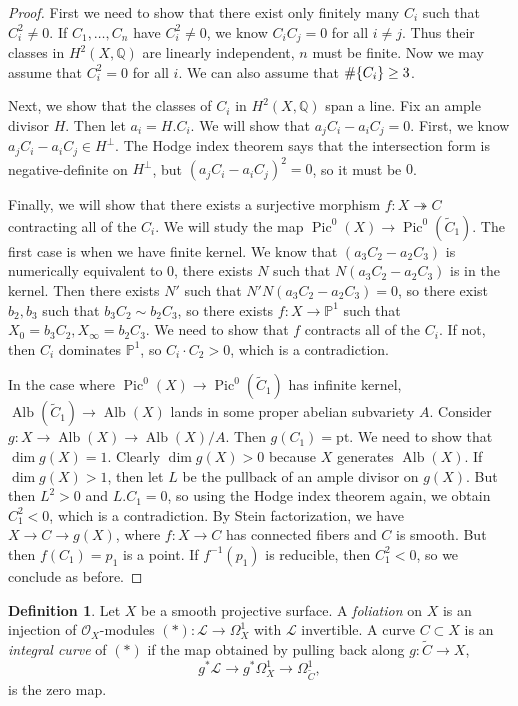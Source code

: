 \documentclass[leqno, openany]{memoir}
\theoremstyle{definition}
\newtheorem{defn}[thm]{Definition}
\theoremstyle{remark}
\theoremstyle{plain}
\theoremstyle{definition}
\theoremstyle{remark}
\newcommand{\Q}{\mathbb{Q}}
\renewcommand{\P}{\mathbb{P}}
\newcommand{\mc}[1]{\mathcal{#1}}
\newcommand{\mr}[1]{\mathrm{#1}}
\newcommand{\wt}[1]{\widetilde{#1}}
\DeclareMathOperator{\Pic}{Pic}
\DeclareMathOperator{\Alb}{Alb}
\begin{document}
\begin{proof}
    First we need to show that there exist only finitely many $C_i$ such that $C_i^2 \neq 0$. If $C_1, \ldots, C_n$ have $C_i^2 \neq 0$, we know $C_i C_j = 0$ for all $i \neq j$. Thus their classes in $H^2(X, \Q)$ are linearly independent, $n$ must be finite. Now we may assume that $C_i^2 = 0$ for all $i$. We can also assume that $\# \qty{C_i} \geq 3$.

    Next, we show that the classes of $C_i$ in $H^2(X, \Q)$ span a line. Fix an ample divisor $H$. Then let $a_i = H . C_i$. We will show that $a_j C_i - a_i C_j = 0$. First, we know $a_j C_i - a_i C_j \in H^{\perp}$. The Hodge index theorem says that the intersection form is negative-definite on $H^{\perp}$, but $(a_j C_i - a_i C_j)^2 = 0$, so it must be $0$.

    Finally, we will show that there exists a surjective morphism $f \colon X \twoheadrightarrow C$ contracting all of the $C_i$. We will study the map $\Pic^0(X) \to \Pic^0(\wt{C}_1)$. The first case is when we have finite kernel. We know that $(a_3 C_2 - a_2 C_3)$ is numerically equivalent to $0$, there exists $N$ such that $N (a_3 C_2 - a_2 C_3)$ is in the kernel. Then there exists $N'$ such that $N'N (a_3 C_2 - a_2 C_3) = 0$, so there exist $b_2, b_3$ such that $b_3 C_2 \sim b_2 C_3$, so there exists $f \colon X \to \P^1$ such that $X_0 = b_3 C_2, X_{\infty} = b_2 C_3$. We need to show that $f$ contracts all of the $C_i$. If not, then $C_i$ dominates $\P^1$, so $C_i \cdot C_2 > 0$, which is a contradiction.

    In the case where $\Pic^0(X) \to \Pic^0(\wt{C}_1)$ has infinite kernel, $\Alb(\wt{C}_1) \to \Alb(X)$ lands in some proper abelian subvariety $A$. Consider $g \colon X \to \Alb(X) \to \Alb(X) / A$. Then $g(C_1) = \mr{pt}$. We need to show that $\dim g(X) = 1$. Clearly $\dim g(X) > 0$ because $X$ generates $\Alb(X)$. If $\dim g(X) > 1$, then let $L$ be the pullback of an ample divisor on $g(X)$. But then $L^2 > 0$ and $L . C_1 = 0$, so using the Hodge index theorem again, we obtain $C_1^2 < 0$, which is a contradiction. By Stein factorization, we have $X \to C \to g(X)$, where $f \colon X \to C$ has connected fibers and $C$ is smooth. But then $f(C_1) = p_1$ is a point. If $f^{-1}(p_1)$ is reducible, then $C_1^2 < 0$, so we conclude as before.
\end{proof}

\begin{defn}
    Let $X$ be a smooth projective surface. A \textit{foliation} on $X$ is an injection of $\mc{O}_X$-modules $(*) \colon \mc{L} \to \Omega^1_X$ with $\mc{L}$ invertible. A curve $C \subset X$ is an \textit{integral curve} of $(*)$ if the map obtained by pulling back along $g \colon \wt{C} \to X$, 
    \[ g^* \mc{L} \to g^* \Omega_X^1 \to \Omega_{\wt{C}}^1, \]
    is the zero map.
\end{defn}
\end{document}

